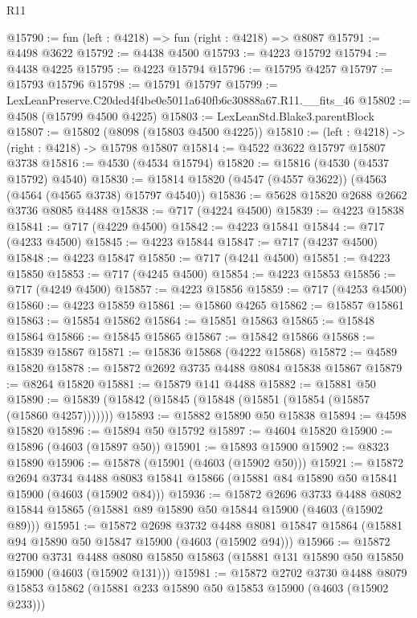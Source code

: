 \begin{lexlean}{R11}
\begin{coremodule}
@15790 := fun (left : @4218) => fun (right : @4218) => @8087
@15791 := @4498 @3622
@15792 := @4438 @4500
@15793 := @4223 @15792
@15794 := @4438 @4225
@15795 := @4223 @15794
@15796 := @15795 @4257
@15797 := @15793 @15796
@15798 := @15791 @15797
@15799 := LexLeanPreserve.C20ded4f4be0e5011a640fb6c30888a67.R11.__fits_46
@15802 := @4508 (@15799 @4500 @4225)
@15803 := LexLeanStd.Blake3.parentBlock
@15807 := @15802 (@8098 (@15803 @4500 @4225))
@15810 := (left : @4218) -> (right : @4218) -> @15798 @15807
@15814 := @4522 @3622 @15797 @15807 @3738
@15816 := @4530 (@4534 @15794)
@15820 := @15816 (@4530 (@4537 @15792) @4540)
@15830 := @15814 @15820 (@4547 (@4557 @3622)) (@4563 (@4564 (@4565 @3738) @15797 @4540))
@15836 := @5628 @15820 @2688 @2662 @3736 @8085 @4488
@15838 := @717 (@4224 @4500)
@15839 := @4223 @15838
@15841 := @717 (@4229 @4500)
@15842 := @4223 @15841
@15844 := @717 (@4233 @4500)
@15845 := @4223 @15844
@15847 := @717 (@4237 @4500)
@15848 := @4223 @15847
@15850 := @717 (@4241 @4500)
@15851 := @4223 @15850
@15853 := @717 (@4245 @4500)
@15854 := @4223 @15853
@15856 := @717 (@4249 @4500)
@15857 := @4223 @15856
@15859 := @717 (@4253 @4500)
@15860 := @4223 @15859
@15861 := @15860 @4265
@15862 := @15857 @15861
@15863 := @15854 @15862
@15864 := @15851 @15863
@15865 := @15848 @15864
@15866 := @15845 @15865
@15867 := @15842 @15866
@15868 := @15839 @15867
@15871 := @15836 @15868 (@4222 @15868)
@15872 := @4589 @15820
@15878 := @15872 @2692 @3735 @4488 @8084 @15838 @15867
@15879 := @8264 @15820
@15881 := @15879 @141 @4488
@15882 := @15881 @50
@15890 := @15839 (@15842 (@15845 (@15848 (@15851 (@15854 (@15857 (@15860 @4257)))))))
@15893 := @15882 @15890 @50 @15838
@15894 := @4598 @15820
@15896 := @15894 @50 @15792
@15897 := @4604 @15820
@15900 := @15896 (@4603 (@15897 @50))
@15901 := @15893 @15900
@15902 := @8323 @15890
@15906 := @15878 (@15901 (@4603 (@15902 @50)))
@15921 := @15872
    @2694
    @3734
    @4488
    @8083
    @15841
    @15866
    (@15881 @84 @15890 @50 @15841 @15900 (@4603 (@15902 @84)))
@15936 := @15872
    @2696
    @3733
    @4488
    @8082
    @15844
    @15865
    (@15881 @89 @15890 @50 @15844 @15900 (@4603 (@15902 @89)))
@15951 := @15872
    @2698
    @3732
    @4488
    @8081
    @15847
    @15864
    (@15881 @94 @15890 @50 @15847 @15900 (@4603 (@15902 @94)))
@15966 := @15872
    @2700
    @3731
    @4488
    @8080
    @15850
    @15863
    (@15881 @131 @15890 @50 @15850 @15900 (@4603 (@15902 @131)))
@15981 := @15872
    @2702
    @3730
    @4488
    @8079
    @15853
    @15862
    (@15881 @233 @15890 @50 @15853 @15900 (@4603 (@15902 @233)))

\end{coremodule}
\end{lexlean}
